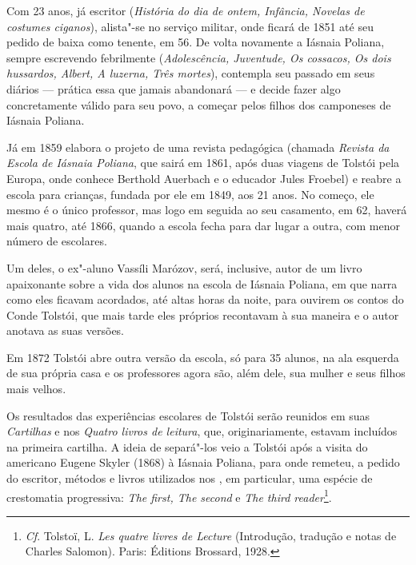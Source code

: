 Com 23 anos, já escritor (\emph{História do dia de ontem, Infância,
Novelas de costumes ciganos}), alista"-se no serviço militar, onde ficará
de 1851 até seu pedido de baixa como tenente, em 56. De volta novamente
a Iásnaia Poliana, sempre escrevendo febrilmente (\emph{Adolescência,
Juventude, Os cossacos, Os dois hussardos, Albert, A luzerna, Três
mortes}), contempla seu passado em seus diários --- prática essa que
jamais abandonará --- e decide fazer algo concretamente válido para seu
povo, a começar pelos filhos dos camponeses de Iásnaia Poliana.

Já em 1859 elabora o projeto de uma revista pedagógica
(chamada \emph{Revista da Escola de Iásnaia Poliana}, que sairá
em 1861, após duas viagens de Tolstói pela Europa, onde conhece Berthold
Auerbach e o educador Jules Froebel) e reabre a escola para crianças,
fundada por ele em 1849, aos 21 anos. No começo, ele mesmo é o
único professor, mas logo em seguida ao seu casamento, em 62, haverá
mais quatro, até 1866, quando a escola fecha para dar lugar a outra, com
menor número de escolares.

Um deles, o ex"-aluno Vassíli Marózov, será, inclusive, autor de um livro
apaixonante sobre a vida dos alunos na escola de Iásnaia
Poliana, em que narra como eles ficavam acordados, até altas horas da
noite, para ouvirem os contos do Conde Tolstói, que mais tarde eles
próprios recontavam à sua maneira e o autor anotava as suas
versões.

Em 1872 Tolstói abre outra versão da escola, só para 35 alunos, na ala esquerda de
sua própria casa e os professores agora são, além dele, sua mulher e
seus filhos mais velhos.

Os resultados das experiências escolares de Tolstói serão reunidos em
suas \emph{Cartilhas} e nos \emph{Quatro livros de leitura}, que,
originariamente, estavam incluídos na primeira cartilha. A ideia de
separá"-los veio a Tolstói após a visita do americano Eugene Skyler
(1868) à Iásnaia Poliana, para onde remeteu, a pedido do escritor,
métodos e livros utilizados nos , em particular, uma espécie de
crestomatia progressiva: \emph{The first, The second} e \emph{The third
reader}\footnote{\emph{Cf}. Tolstoï, L. \emph{Les quatre livres de
  Lecture} (Introdução, tradução e notas de Charles Salomon). Paris: Éditions
  Brossard, 1928.}.

